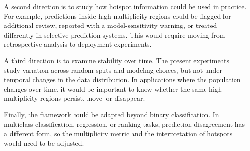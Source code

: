 A second direction is to study how hotspot information could be used in practice. For
example, predictions inside high-multiplicity regions could be flagged for additional
review, reported with a model-sensitivity warning, or treated differently in selective
prediction systems. This would require moving from retrospective analysis to deployment
experiments.

A third direction is to examine stability over time. The present experiments study
variation across random splits and modeling choices, but not under temporal changes in
the data distribution. In applications where the population changes over time, it would be
important to know whether the same high-multiplicity regions persist, move, or disappear.

Finally, the framework could be adapted beyond binary classification. In multiclass
classification, regression, or ranking tasks, prediction disagreement has a different form,
so the multiplicity metric and the interpretation of hotspots would need to be adjusted.